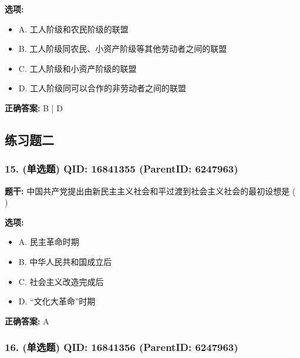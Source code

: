 \documentclass[12pt,UTF8]{ctexart}
\begin{document}
\textbf{选项:}
\begin{itemize}[leftmargin=*]

  \item A. 工人阶级和农民阶级的联盟

  \item B. 工人阶级同农民、小资产阶级等其他劳动者之间的联盟

  \item C. 工人阶级和小资产阶级的联盟

  \item D. 工人阶级同可以合作的非劳动者之间的联盟

\end{itemize}

\textbf{正确答案:}
B | D

\vspace{0.3em}\hrulefill\vspace{0.7em}

\subsection*{练习题二}

\subsubsection*{15. (单选题) \small QID: 16841355 (ParentID: 6247963)}

\textbf{题干:}
中国共产党提出由新民主主义社会和平过渡到社会主义社会的最初设想是 ( )



\textbf{选项:}
\begin{itemize}[leftmargin=*]

  \item A. 民主革命时期

  \item B. 中华人民共和国成立后

  \item C. 社会主义改造完成后

  \item D. “文化大革命”时期

\end{itemize}

\textbf{正确答案:}
A

\vspace{0.3em}\hrulefill\vspace{0.7em}

\subsubsection*{16. (单选题) \small QID: 16841356 (ParentID: 6247963)}
\end{document}
